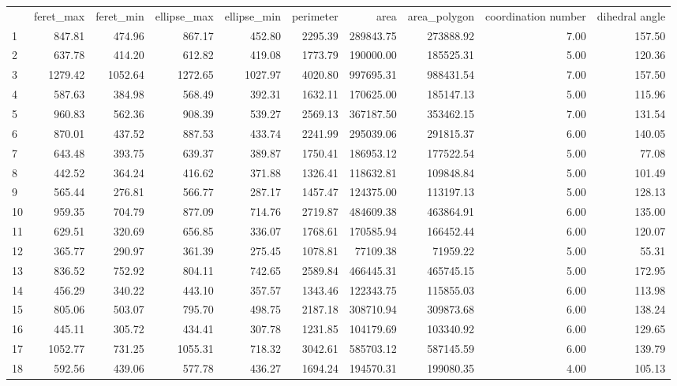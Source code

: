 \begin{tabular}{lrrrrrrrrr}
 & feret_max & feret_min & ellipse_max & ellipse_min & perimeter & area & area_polygon & coordination number & dihedral angle \\
1 & 847.81 & 474.96 & 867.17 & 452.80 & 2295.39 & 289843.75 & 273888.92 & 7.00 & 157.50 \\
2 & 637.78 & 414.20 & 612.82 & 419.08 & 1773.79 & 190000.00 & 185525.31 & 5.00 & 120.36 \\
3 & 1279.42 & 1052.64 & 1272.65 & 1027.97 & 4020.80 & 997695.31 & 988431.54 & 7.00 & 157.50 \\
4 & 587.63 & 384.98 & 568.49 & 392.31 & 1632.11 & 170625.00 & 185147.13 & 5.00 & 115.96 \\
5 & 960.83 & 562.36 & 908.39 & 539.27 & 2569.13 & 367187.50 & 353462.15 & 7.00 & 131.54 \\
6 & 870.01 & 437.52 & 887.53 & 433.74 & 2241.99 & 295039.06 & 291815.37 & 6.00 & 140.05 \\
7 & 643.48 & 393.75 & 639.37 & 389.87 & 1750.41 & 186953.12 & 177522.54 & 5.00 & 77.08 \\
8 & 442.52 & 364.24 & 416.62 & 371.88 & 1326.41 & 118632.81 & 109848.84 & 5.00 & 101.49 \\
9 & 565.44 & 276.81 & 566.77 & 287.17 & 1457.47 & 124375.00 & 113197.13 & 5.00 & 128.13 \\
10 & 959.35 & 704.79 & 877.09 & 714.76 & 2719.87 & 484609.38 & 463864.91 & 6.00 & 135.00 \\
11 & 629.51 & 320.69 & 656.85 & 336.07 & 1768.61 & 170585.94 & 166452.44 & 6.00 & 120.07 \\
12 & 365.77 & 290.97 & 361.39 & 275.45 & 1078.81 & 77109.38 & 71959.22 & 5.00 & 55.31 \\
13 & 836.52 & 752.92 & 804.11 & 742.65 & 2589.84 & 466445.31 & 465745.15 & 5.00 & 172.95 \\
14 & 456.29 & 340.22 & 443.10 & 357.57 & 1343.46 & 122343.75 & 115855.03 & 6.00 & 113.98 \\
15 & 805.06 & 503.07 & 795.70 & 498.75 & 2187.18 & 308710.94 & 309873.68 & 6.00 & 138.24 \\
16 & 445.11 & 305.72 & 434.41 & 307.78 & 1231.85 & 104179.69 & 103340.92 & 6.00 & 129.65 \\
17 & 1052.77 & 731.25 & 1055.31 & 718.32 & 3042.61 & 585703.12 & 587145.59 & 6.00 & 139.79 \\
18 & 592.56 & 439.06 & 577.78 & 436.27 & 1694.24 & 194570.31 & 199080.35 & 4.00 & 105.13 \\

\end{tabular}
